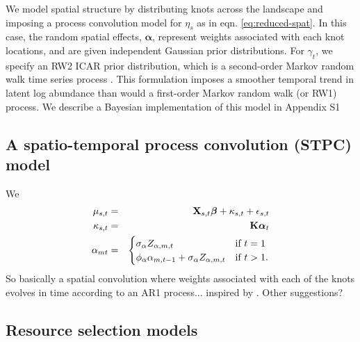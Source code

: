 \documentclass[times,mee,doublespace,]{besauth2}
\begin{document}
We model spatial structure by distributing knots across the landscape and imposing a process convolution model for $\eta_s$ as in eqn. \ref{eq:reduced-spat}.  In this case, the random spatial effects, $\boldsymbol{\alpha}$, represent weights associated with each knot locations, and are given independent Gaussian prior distributions.
For $\gamma_t$, we specify an RW2 ICAR prior distribution, which is a second-order Markov random walk time series process \citep{RueHeld2005}.  This formulation imposes a smoother temporal trend in latent log abundance than would a first-order Markov random walk (or RW1) process.  We describe a Bayesian implementation of this model in Appendix S1

\subsection{A spatio-temporal process convolution (STPC) model}
We
\begin{eqnarray*}
  \mu_{s,t} & = & {\bf X}_{s,t} \boldsymbol{\beta} + \kappa_{s,t} + \epsilon_{s,t} \\
  \kappa_{s,t} & = & {\bf K} \boldsymbol{\alpha}_t \\
  \alpha_{mt} & = &  \begin{cases}
                    \sigma_\alpha Z_{\alpha,m,t} & \text{if }t=1 \\
                    \phi_\alpha \alpha_{m,t-1} + \sigma_\alpha Z_{\alpha,m,t} & \text{if }t>1.
                  \end{cases}
\end{eqnarray*}
So basically a spatial convolution where weights associated with each of the knots evolves in time according to an AR1 process... inspired by \citet{CalderEtAl2002,Higdon2002}.  Other suggestions?

\subsection{Resource selection models}
\end{document}

